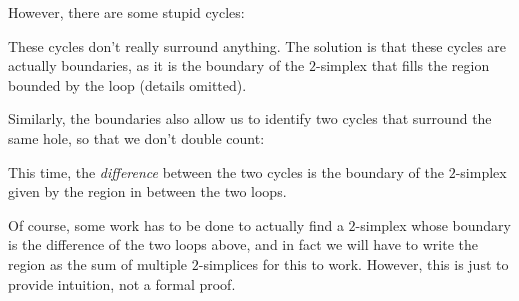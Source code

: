 \documentclass[a4paper]{article}
\theoremstyle{definition}
\begin{document}
\begin{eg}
  However, there are some stupid cycles:
  \begin{center}
  \end{center}
  These cycles don't really surround anything. The solution is that these cycles are actually boundaries, as it is the boundary of the $2$-simplex that fills the region bounded by the loop (details omitted).

  Similarly, the boundaries also allow us to identify two cycles that surround the same hole, so that we don't double count:
  \begin{center}
  \end{center}
  This time, the \emph{difference} between the two cycles is the boundary of the $2$-simplex given by the region in between the two loops.

  Of course, some work has to be done to actually find a $2$-simplex whose boundary is the difference of the two loops above, and in fact we will have to write the region as the sum of multiple $2$-simplices for this to work. However, this is just to provide intuition, not a formal proof.
\end{eg}
\end{document}
